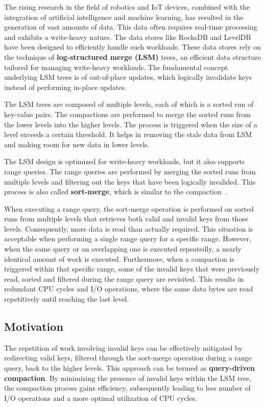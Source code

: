  The rising research in the field of robotics and IoT devices, combined with the 
integration of artificial intelligence and machine learning, has resulted in the generation of vast amounts of data.
This data often requires real-time processing and exhibits a write-heavy nature. The data stores like RocksDB and 
LevelDB have been designed to efficiently handle such workloads. These data stores rely on the technique of
\textbf{log-structured merge (LSM)} trees, an efficient data structure tailored for managing write-heavy workloads. The
fundamental concept underlying LSM trees is of out-of-place updates, which logically invalidate keys instead of 
performing in-place updates.

 The LSM trees are composed of multiple levels, each of which is a sorted run of key-value pairs. 
The compactions are performed to merge the sorted runs from the lower levels into the higher levels. The process is 
triggered when the size of a level exceeds a certain threshold. It helps in removing the stale data from LSM and 
making room for new data in lower levels.

 The LSM design is optimized for write-heavy workloads, but it also supports range queries. The
range queries are performed by merging the sorted runs from multiple levels and filtering out the keys that have been
logically invalided. This process is also called \textbf{sort-merge}, which is similar to the compaction~\cite{Sarkar2021}.

 When executing a range query, the sort-merge operation is performed on sorted runs from multiple 
levels that retrieves both valid and invalid keys from those levels. Consequently, more data is read than 
actually required. This situation is acceptable when performing a single range query for a specific range. However, when 
the same query or an overlapping one is executed repeatedly, a nearly identical amount of work is executed. Furthermore, 
when a compaction is triggered within that specific range, some of the invalid keys that were previously read, sorted 
and filtered during the range query are revisited. This results in redundant CPU cycles and I/O operations, where the 
same data bytes are read repetitively until reaching the last level.


\subsection{Motivation}
The repetition of work involving invalid keys can be effectively mitigated by redirecting valid keys, filtered through 
the sort-merge operation during a range query, back to the higher levels. This approach can be termed as 
\textbf{query-driven compaction}. By minimizing the presence of invalid keys within the LSM tree, the compaction process 
gains efficiency, subsequently leading to less number of I/O operations and a more optimal utilization of CPU cycles.


